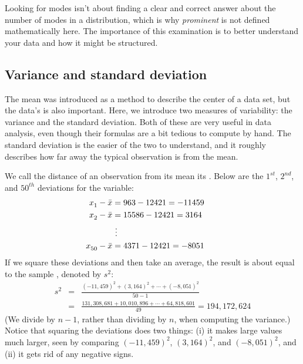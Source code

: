 \begin{tipBox}{
Looking for modes isn't about finding a clear and correct answer about the number of modes in a distribution, which is why \emph{prominent} is not defined mathematically here. The importance of this examination is to better understand your data and how it might be structured.}
\end{tipBox}


\subsection{Variance and standard deviation}
\label{variability}

The mean was introduced as a method to describe the center of a data set, but the data's  is also important. Here, we introduce two measures of variability: the variance and the standard deviation. Both of these are very useful in data analysis, even though their formulas are a bit tedious to compute by hand. The standard deviation is the easier of the two to understand, and it roughly describes how far away the typical observation is from the mean.

We call the distance of an observation from its mean its . Below are the $1^{st}_{}$, $2^{nd}_{}$, and $50^{th}_{}$ deviations for the  variable:
\begin{align*}
x_1^{}-\bar{x} &= 963 - 12421 = -11459 \hspace{5mm}\text{ } \\
x_2^{}-\bar{x} &= 15586 - 12421 = 3164 \\
			&\ \vdots \\
x_{50}^{}-\bar{x} &= 4371 - 12421 = -8051
\end{align*}
If we square these deviations and then take an average, the result is about equal to the sample \label{varianceIsDefined}, denoted by $s_{}^2$:
\begin{eqnarray*}
s_{}^2 &=& \frac{(-11,459)_{}^2 + (3,164)_{}^2 + \cdots + (-8,051)_{}^2}{50-1} \\
	&=& \frac{131,308,681 + 10,010,896 + \cdots + 64,818,601}{49} = 194,172,624
\end{eqnarray*}
(We divide by $n-1$, rather than dividing by $n$, when computing the variance.) Notice that squaring the deviations does two things: (i) it makes large values much larger, seen by comparing $(-11,459)^2$, $(3,164)^2$, and $(-8,051)^2$, and (ii) it gets rid of any negative signs.

